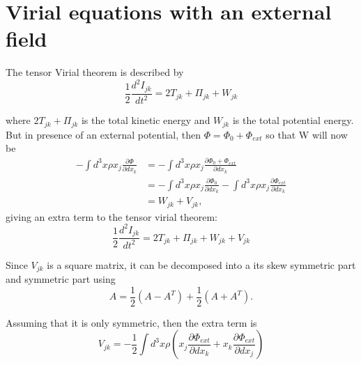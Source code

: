 \section{Virial equations with an external field}

The tensor Virial theorem is described by
\begin{equation}
    \frac{1}{2}\frac{d^2I_{jk}}{dt^2}=2T_{jk}+\Pi_{jk}+W_{jk}
\end{equation}

where $2T_{jk}+\Pi_{jk}$ is the total kinetic energy and $W_{jk}$ is the total potential energy. But in presence of an external potential, then $\Phi=\Phi_0+\Phi_{ext}$ so that W will now be 
\begin{align*}
    -\int d^3x\rho x_j\frac{\partial\Phi}{\partial dx_k}&=-\int d^3x\rho x_j\frac{\partial\Phi_0+\Phi_{ext}}{\partial dx_k}\\
    &=-\int d^3x\rho x_j\frac{\partial\Phi_0}{\partial dx_k}-\int d^3x\rho x_j\frac{\partial\Phi_{ext}}{\partial dx_k}\\
    &=W_{jk}+V_{jk},
\end{align*}
giving an extra term to the tensor virial theorem:
\begin{equation}
    \frac{1}{2}\frac{d^2I_{jk}}{dt^2}=2T_{jk}+\Pi_{jk}+W_{jk}+V_{jk}
\end{equation}


Since $V_{jk}$ is a square matrix, it can be decomposed into a its skew symmetric part and symmetric part using
\begin{equation}
    A=\frac{1}{2}(A-A^T)+\frac{1}{2}(A + A^T).
\end{equation}

Assuming that it is only symmetric, then the extra term is 
\begin{equation*}
    V_{jk}=-\frac{1}{2}\int d^3x\rho\left( x_j\frac{\partial\Phi_{ext}}{\partial dx_k}+x_k\frac{\partial\Phi_{ext}}{\partial dx_j}\right)
\end{equation*}



